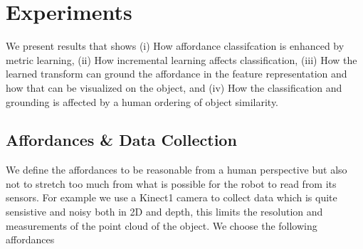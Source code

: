 \section{Experiments}\label{experiments}

We present results that shows (i) How affordance classifcation is
enhanced by metric learning, (ii) How incremental learning affects
classification, (iii) How the learned transform can ground the
affordance in the feature representation and how that can be visualized
on the object, and (iv) How the classification and grounding is affected
by a human ordering of object similarity.

\subsection{Affordances \& Data
Collection}\label{affordances-data-collection}

We define the affordances to be reasonable from a human perspective but
also not to stretch too much from what is possible for the robot to read
from its sensors. For example we use a Kinect1 camera to collect data
which is quite sensistive and noisy both in 2D and depth, this limits
the resolution and measurements of the point cloud of the object. We
choose the following affordances

\small

